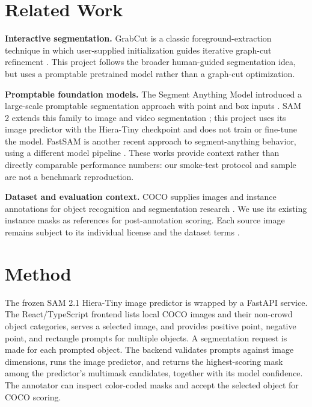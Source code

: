 \documentclass[11pt]{article}
\begin{document}
\section{Related Work}
\label{sec:related}
\textbf{Interactive segmentation.}
GrabCut is a classic foreground-extraction technique in which user-supplied
initialization guides iterative graph-cut refinement \citep{rother2004grabcut}.
This project follows the broader human-guided segmentation idea, but uses a
promptable pretrained model rather than a graph-cut optimization.

\textbf{Promptable foundation models.}
The Segment Anything Model introduced a large-scale promptable segmentation
approach with point and box inputs \citep{kirillov2023sam}. SAM 2 extends this
family to image and video segmentation \citep{ravi2024sam2}; this project uses
its image predictor with the Hiera-Tiny checkpoint and does not train or
fine-tune the model. FastSAM is another recent approach to segment-anything
behavior, using a different model pipeline \citep{zhao2023fastsam}. These works
provide context rather than directly comparable performance numbers: our
smoke-test protocol and sample are not a benchmark reproduction.

\textbf{Dataset and evaluation context.}
COCO supplies images and instance annotations for object recognition and
segmentation research \citep{lin2014coco}. We use its existing instance masks
as references for post-annotation scoring. Each source image remains subject
to its individual license and the dataset terms \citep{cocoTerms}.

\section{Method}
\label{sec:method}
The frozen SAM 2.1 Hiera-Tiny image predictor is wrapped by a FastAPI service.
The React/TypeScript frontend lists local COCO images and their non-crowd
object categories, serves a selected image, and provides positive point,
negative point, and rectangle prompts for multiple objects. A segmentation
request is made for each prompted object. The backend validates prompts against
image dimensions, runs the image predictor, and returns the highest-scoring
mask among the predictor's multimask candidates, together with its model
confidence. The annotator can inspect color-coded masks and accept the selected
object for COCO scoring.
\end{document}
